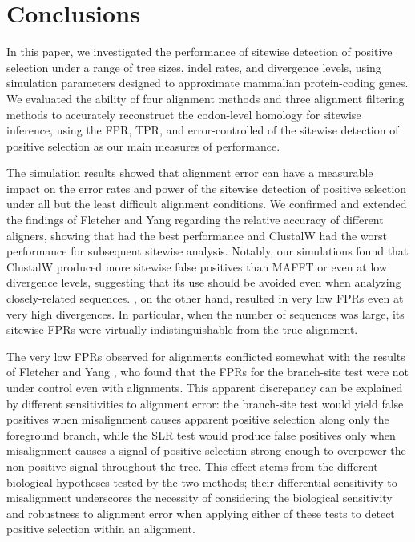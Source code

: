 \documentclass{article}
\begin{document}
\section*{Conclusions}

In this paper, we investigated the performance of sitewise detection
of positive selection under a range of tree sizes, indel rates, and
divergence levels, using simulation parameters designed to approximate
mammalian protein-coding genes. We evaluated the ability of four
alignment methods and three alignment filtering methods to accurately
reconstruct the codon-level homology for sitewise inference, using the
FPR, TPR, and error-controlled \tpr of the sitewise detection of
positive selection as our main measures of performance.

The simulation results showed that alignment error can have a
measurable impact on the error rates and power of the sitewise
detection of positive selection under all but the least difficult
alignment conditions. We confirmed and extended the findings of
Fletcher and Yang \citeyearpar{Fletcher2010Effect} regarding the
relative accuracy of different aligners, showing that \prankc had the
best performance and ClustalW had the worst performance for subsequent
sitewise analysis. Notably, our simulations found that ClustalW
produced more sitewise false positives than MAFFT or \prankc even at
low divergence levels, suggesting that its use should be avoided even
when analyzing closely-related sequences. \prankc, on the other hand,
resulted in very low FPRs even at very high divergences. In
particular, when the number of sequences was large, its sitewise FPRs
were virtually indistinguishable from the true alignment.

The very low FPRs observed for \prankc alignments conflicted somewhat
with the results of Fletcher and Yang
\citeyearpar{Fletcher2010Effect}, who found that the FPRs for the
branch-site test were not under control even with \prankc
alignments. This apparent discrepancy can be explained by different
sensitivities to alignment error: the branch-site test would yield
false positives when misalignment causes apparent positive selection
along only the foreground branch, while the SLR test would produce
false positives only when misalignment causes a signal of positive
selection strong enough to overpower the non-positive signal
throughout the tree. This effect stems from the different biological
hypotheses tested by the two methods; their differential sensitivity
to misalignment underscores the necessity of considering the
biological sensitivity and robustness to alignment error when applying
either of these tests to detect positive selection within an
alignment.
\end{document}
